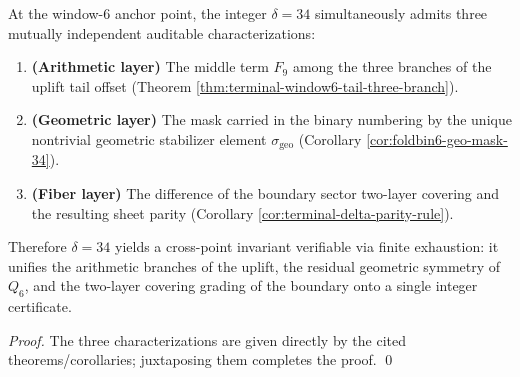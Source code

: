 \begin{corollary}[Triple Identity of \texorpdfstring{$\delta=34$}{delta=34} (Arithmetic/Geometric/Fiber)]\label{cor:bdry-delta34-triple-identity}
At the window-\(6\) anchor point, the integer \(\delta=34\) simultaneously admits three mutually independent auditable characterizations:
\begin{enumerate}
  \item \textbf{(Arithmetic layer)} The middle term \(F_9\) among the three branches of the uplift tail offset (Theorem \ref{thm:terminal-window6-tail-three-branch}).
  \item \textbf{(Geometric layer)} The mask carried in the binary numbering by the unique nontrivial geometric stabilizer element \(\sigma_{\mathrm{geo}}\) (Corollary \ref{cor:foldbin6-geo-mask-34}).
  \item \textbf{(Fiber layer)} The difference of the boundary sector two-layer covering and the resulting sheet parity (Corollary \ref{cor:terminal-delta-parity-rule}).
\end{enumerate}
Therefore \(\delta=34\) yields a cross-point invariant verifiable via finite exhaustion: it unifies the arithmetic branches of the uplift, the residual geometric symmetry of \(Q_6\), and the two-layer covering grading of the boundary onto a single integer certificate.
\end{corollary}
\begin{proof}
The three characterizations are given directly by the cited theorems/corollaries; juxtaposing them completes the proof. \qed
\end{proof}

